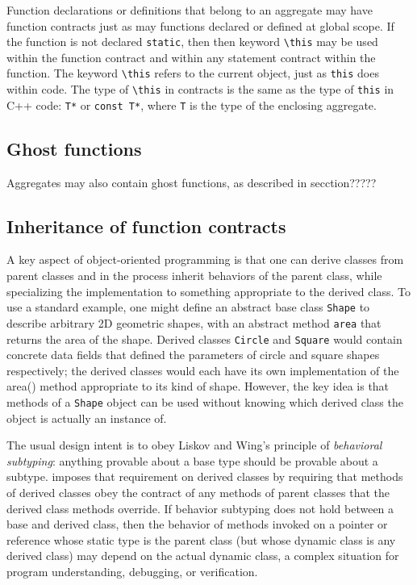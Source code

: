 Function declarations or definitions that belong to an aggregate may have function
contracts just as may functions declared or defined at global scope. If the function is not declared \lstinline|static|, then
then keyword \lstinline|\this| may be used within the function
contract and within any statement contract within the 
function. The keyword \lstinline|\this| refers to the current
object, just as \lstinline|this| does within \lang code.
The type of \lstinline|\this| in contracts is the same as the type of \lstinline|this| in C++ code: \lstinline|T*| or \lstinline|const T*|, where \lstinline|T| is the type of the enclosing aggregate.

\subsection{Ghost functions}
Aggregates may also contain ghost functions, as described in secction????? 


\subsection{Inheritance of function contracts}

A key aspect of object-oriented programming is 
that one can derive classes from parent classes and in 
the process inherit behaviors of the parent class, 
while specializing the implementation to something appropriate to the derived class. 
To use a standard example, 
one might define an abstract base class \lstinline|Shape| to describe arbitrary 2D geometric shapes, 
with an abstract method 
\lstinline|area| that returns the area of the shape. 
Derived classes \lstinline|Circle| and \lstinline|Square| would contain concrete data fields that defined the parameters of circle and square shapes respectively; 
the derived classes would each have its own implementation of the area() method appropriate to its kind of shape. 
However, the key idea is that methods of a \lstinline|Shape| object can be used without knowing which derived class the object is actually an instance of.

The usual design intent is to obey Liskov and Wing's principle of \textit{behavioral subtyping}\cite{Liskov:1994:BNS:197320.197383}: 
anything provable about a base type should be provable about a subtype.
\NAME{} imposes that requirement on derived classes by 
requiring that methods of derived classes obey the contract of any methods of parent classes that the derived class methods override. 
If behavior subtyping does not hold between a base and derived class, then the behavior of methods
invoked on a pointer or reference whose static type is the
parent class (but whose dynamic class is any derived class) may depend on the actual dynamic class, 
a complex situation for program understanding, debugging, or verification.

